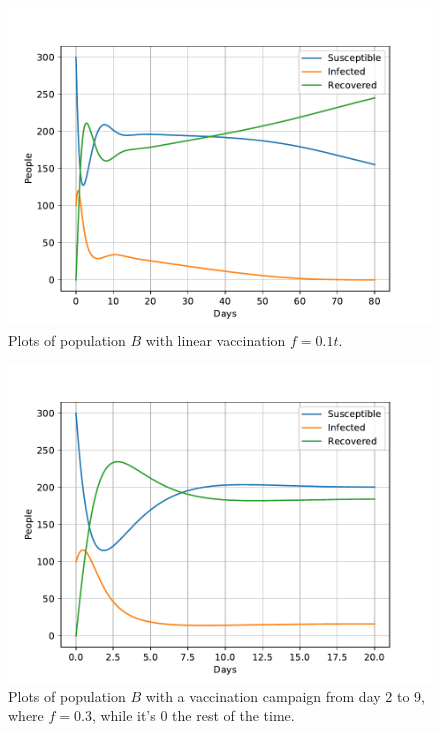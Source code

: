 \documentclass[a4paper]{article}
\begin{document}
\begin{figure}[!htb]
	\centering 
	\includegraphics[scale=0.56]{../plots/opp_e_B2.pdf}	
	\caption{Plots of population $B$ with linear vaccination $f=0.1 t$.}
	\label{opp_e1}
\end{figure}

\begin{figure}[!htb]
	\centering 
	\includegraphics[scale=0.56]{../plots/opp_e_fb.pdf}	
	\caption{Plots of population $B$ with a vaccination campaign from day 2 to 9, where $f=0.3$, while it's 0 the rest of the time.}
	\label{opp_e2}
\end{figure}
\end{document}
